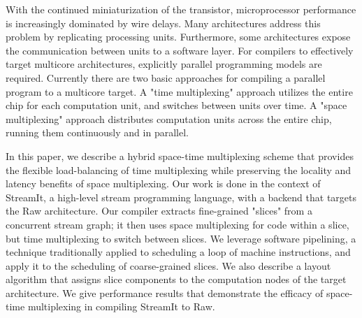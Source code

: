With the continued miniaturization of the transistor, microprocessor
performance is increasingly dominated by wire delays.  Many
architectures address this problem by replicating processing units.
Furthermore, some architectures expose the communication between units
to a software layer.  For compilers to effectively target multicore
architectures, explicitly parallel programming models are required.
Currently there are two basic approaches for compiling a parallel
program to a multicore target.  A "time multiplexing" approach
utilizes the entire chip for each computation unit, and switches
between units over time.  A "space multiplexing" approach distributes
computation units across the entire chip, running them continuously
and in parallel.

In this paper, we describe a hybrid space-time multiplexing scheme
that provides the flexible load-balancing of time multiplexing while
preserving the locality and latency benefits of space multiplexing.
Our work is done in the context of StreamIt, a high-level stream
programming language, with a backend that targets the Raw
architecture.  Our compiler extracts fine-grained "slices" from a
concurrent stream graph; it then uses space multiplexing for code
within a slice, but time multiplexing to switch between slices. We
leverage software pipelining, a technique traditionally applied to
scheduling a loop of machine instructions, and apply it to the
scheduling of coarse-grained slices.  We also describe a layout
algorithm that assigns slice components to the computation nodes of
the target architecture.  We give performance results that demonstrate
the efficacy of space-time multiplexing in compiling StreamIt to Raw.
